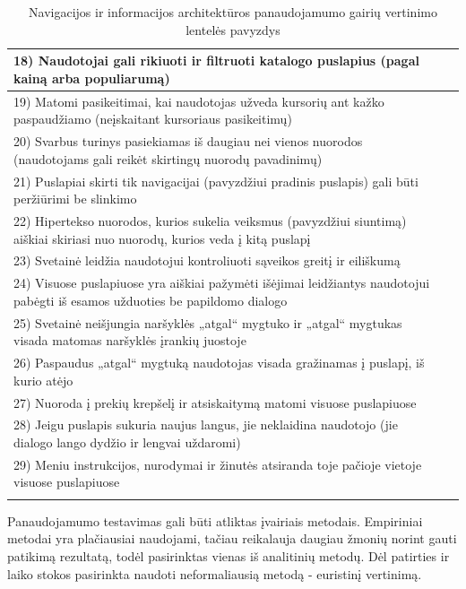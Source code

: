 \documentclass{VUMIFPSkursinis}
\begin{document}
\begin{center}
\begin{longtable}{ |p{}|p{2cm}| }
	18) Naudotojai gali rikiuoti ir filtruoti katalogo puslapius (pagal kainą arba populiarumą) &  \\ \hline
	19) Matomi pasikeitimai, kai naudotojas užveda kursorių ant kažko paspaudžiamo (neįskaitant kursoriaus pasikeitimų) &  \\ \hline
	20) Svarbus turinys pasiekiamas iš daugiau nei vienos nuorodos (naudotojams gali reikėt skirtingų nuorodų pavadinimų) &  \\ \hline
	21) Puslapiai skirti tik navigacijai (pavyzdžiui pradinis puslapis) gali būti peržiūrimi be slinkimo &  \\ \hline
	22) Hipertekso nuorodos, kurios sukelia veiksmus (pavyzdžiui siuntimą) aiškiai skiriasi nuo nuorodų, kurios veda į kitą puslapį &  \\ \hline
	23) Svetainė leidžia naudotojui kontroliuoti sąveikos greitį ir eiliškumą &  \\ \hline
	24) Visuose puslapiuose yra aiškiai pažymėti išėjimai leidžiantys naudotojui pabėgti iš esamos užduoties be papildomo dialogo &  \\ \hline
	25) Svetainė neišjungia naršyklės „atgal“ mygtuko ir „atgal“ mygtukas visada matomas naršyklės įrankių juostoje &  \\ \hline
	26) Paspaudus „atgal“ mygtuką naudotojas visada gražinamas į puslapį, iš kurio atėjo &  \\ \hline
	27) Nuoroda į prekių krepšelį ir atsiskaitymą matomi visuose puslapiuose &  \\ \hline
	28) Jeigu puslapis sukuria naujus langus, jie neklaidina naudotojo (jie dialogo lango dydžio ir lengvai uždaromi) &  \\ \hline
	29) Meniu instrukcijos, nurodymai ir žinutės atsiranda toje pačioje vietoje visuose puslapiuose &  \\ \hline
	\caption{Navigacijos ir informacijos architektūros panaudojamumo gairių vertinimo lentelės pavyzdys}\label{navigacijosirIAlentelėpvz}
\end{longtable}

\end{center}

Panaudojamumo testavimas gali būti atliktas įvairiais metodais. Empiriniai metodai yra plačiausiai naudojami\cite{NielsenUsabilityEn}, tačiau reikalauja daugiau žmonių norint gauti patikimą rezultatą, todėl pasirinktas vienas iš analitinių metodų. Dėl patirties ir laiko stokos pasirinkta naudoti neformaliausią metodą - euristinį vertinimą.
\end{document}
